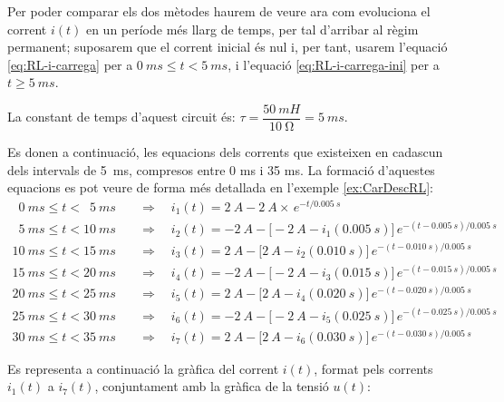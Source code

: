 \begin{exemple}
    Per  poder comparar els dos mètodes haurem de veure  ara com evoluciona el corrent $i(t)$ en un període més llarg de temps, per tal d'arribar al règim permanent; suposarem que el corrent inicial és nul i, per tant, usarem l'equació \eqref{eq:RL-i-carrega} per a $\qty{0}{ms} \leq t < \qty{5}{ms}$, i l'equació \eqref{eq:RL-i-carrega-ini} per a $t \geq \qty{5}{ms}$.

    La constant de temps d'aquest circuit és: $\tau = \dfrac{\qty{50}{mH}}{\qty{10}{\ohm}} = \qty{5}{ms}$.


    Es donen a continuació, les equacions dels corrents que existeixen en cadascun dels intervals de \qty{5}{ms}, compresos entre 0 ms i 35 ms. La formació d'aquestes equacions es pot veure de forma més detallada en l'exemple \vref{ex:CarDescRL}:
    \begin{align*}
      \phantom{0}\qty{0}{ms} \leq t < \phantom{0}\qty{5}{ms}  & \quad\Rightarrow\quad i_1(t) = \qty{2}{A} - \qty{2}{A} \times \,e^{-t/\qty{0,005}{s}} \\
      \phantom{0}\qty{5}{ms} \leq t < \qty{10}{ms} & \quad\Rightarrow\quad i_2(t) = -\qty{2}{A} - \big[-\qty{2}{A} - i_1(\qty{0,005}{s})\big]\, e^{-(t-\qty{0,005}{s})/\qty{0,005}{s}}  \\
      \qty{10}{ms}\leq t < \qty{15}{ms} & \quad\Rightarrow\quad i_3(t) = \qty{2}{A} - \big[\qty{2}{A} - i_2(\qty{0,010}{s})\big]\, e^{-(t-\qty{0,010}{s})/\qty{0,005}{s}} \\
      \qty{15}{ms} \leq t < \qty{20}{ms} & \quad\Rightarrow\quad i_4(t) = -\qty{2}{A} - \big[-\qty{2}{A} - i_3(\qty{0,015}{s})\big]\, e^{-(t-\qty{0,015}{s})/\qty{0,005}{s}}  \\
      \qty{20}{ms}\leq t < \qty{25}{ms} & \quad\Rightarrow\quad i_5(t) = \qty{2}{A} - \big[\qty{2}{A} - i_4(\qty{0,020}{s})\big]\, e^{-(t-\qty{0,020}{s})/\qty{0,005}{s}} \\
      \qty{25}{ms} \leq t < \qty{30}{ms} & \quad\Rightarrow\quad i_6(t) = -\qty{2}{A} - \big[-\qty{2}{A} - i_5(\qty{0,025}{s})\big]\, e^{-(t-\qty{0,025}{s})/\qty{0,005}{s}}  \\
      \qty{30}{ms}\leq t < \qty{35}{ms} & \quad\Rightarrow\quad i_7(t) = \qty{2}{A} - \big[\qty{2}{A} - i_6(\qty{0,030}{s})\big]\, e^{-(t-\qty{0,030}{s})/\qty{0,005}{s}}
    \end{align*}

    Es representa a continuació la gràfica del corrent $i(t)$, format pels corrents $i_1(t)$ a $i_7(t)$, conjuntament amb la gràfica de la tensió $u(t)$:
    \begin{center}
      
    \end{center}


\end{exemple}

